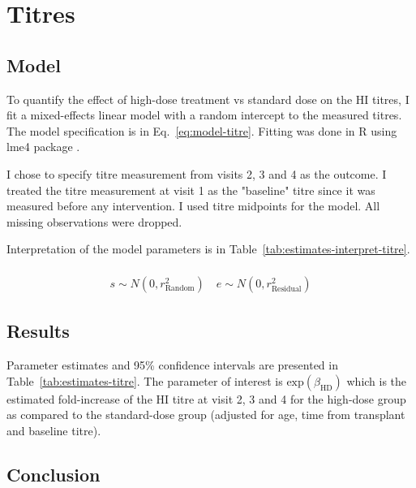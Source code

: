 \documentclass[11pt]{article}
\begin{document}
\section{Titres}

\subsection{Model}

To quantify the effect of high-dose treatment vs standard dose on the
HI titres, I fit a mixed-effects linear model with a random intercept
to the measured titres.
The model specification is in Eq.~\ref{eq:model-titre}.
Fitting was done in R \cite{R} using lme4 package \cite{lme4}.

I chose to specify titre measurement from visits 2, 3 and 4 as the outcome.
I treated the titre measurement at visit 1 as the "baseline" titre since
it was measured before any intervention. I used titre midpoints for the model.
All missing observations were dropped.

Interpretation of the model parameters is in
Table~\ref{tab:estimates-interpret-titre}.

\begin{equation}
    \begin{gathered}
        \label{eq:model-titre}
        \\
        s \sim N(0, r^2_{\text{Random}}) \quad e \sim N(0, r^2_{\text{Residual}})
    \end{gathered}
\end{equation}





\subsection{Results}

Parameter estimates and 95\% confidence intervals
are presented in Table~\ref{tab:estimates-titre}.
The parameter of interest is $\text{exp}(\beta_{\text{HD}})$
which is the estimated
fold-increase of the HI titre at visit 2, 3 and 4 for the high-dose group
as compared to the standard-dose group (adjusted for age, time from transplant
and baseline titre).



\subsection{Conclusion}
\end{document}

